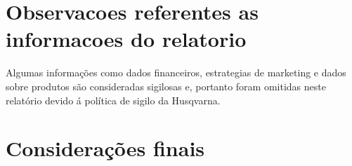 \documentclass[12pt]{article}
\begin{document}
\pagebreak

\section{Observacoes referentes as informacoes do relatorio}
	Algumas informações como dados financeiros, estrategias de marketing e dados sobre produtos são consideradas sigilosas e, portanto foram omitidas neste relatório devido á política de sigilo da Husqvarna.
\pagebreak

\section{Considerações finais}
\pagebreak
\end{document}
